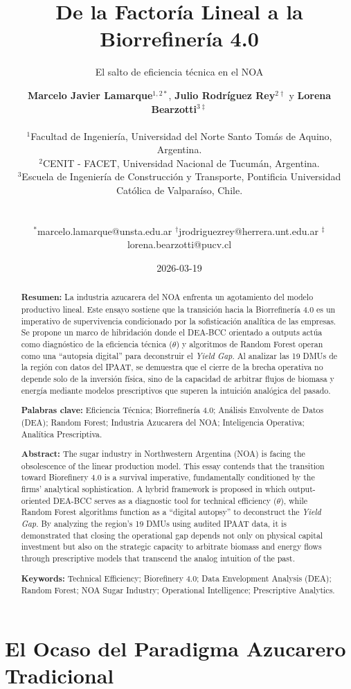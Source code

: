 \documentclass[
  spanish]{cyta}
\title{De la Factoría Lineal a la Biorrefinería 4.0}
\subtitle{El salto de eficiencia técnica en el NOA}
\author{\normalsize \textbf{Marcelo Javier Lamarque}$^{1,2*}$, \textbf{Julio Rodríguez Rey}$^{2\dagger}$ y \textbf{Lorena Bearzotti}$^{3\ddagger}$ \\[0.4cm] \parbox{\textwidth}{\centering \footnotesize $^{1}$Facultad de Ingeniería, Universidad del Norte Santo Tomás de Aquino, Argentina.\\ $^{2}$CENIT - FACET, Universidad Nacional de Tucumán, Argentina.\\ $^{3}$Escuela de Ingeniería de Construcción y Transporte, Pontificia Universidad Católica de Valparaíso, Chile.} \\[0.4cm] \parbox{\textwidth}{\centering \scriptsize $^*$marcelo.lamarque@unsta.edu.ar \quad $^\dagger$jrodriguezrey@herrera.unt.edu.ar \quad $^\ddagger$lorena.bearzotti@pucv.cl}}
\date{2026-03-19}
\begin{document}
\maketitle
\begin{abstract}
\textbf{Resumen:} La industria azucarera del NOA enfrenta un agotamiento
del modelo productivo lineal. Este ensayo sostiene que la transición
hacia la Biorrefinería 4.0 es un imperativo de supervivencia
condicionado por la sofisticación analítica de las empresas. Se propone
un marco de hibridación donde el DEA-BCC orientado a outputs actúa como
diagnóstico de la eficiencia técnica (\(\theta\)) y algoritmos de Random
Forest operan como una ``autopsia digital'' para deconstruir el
\emph{Yield Gap}. Al analizar las 19 DMUs de la región con datos del
IPAAT, se demuestra que el cierre de la brecha operativa no depende solo
de la inversión física, sino de la capacidad de arbitrar flujos de
biomasa y energía mediante modelos prescriptivos que superen la
intuición analógica del pasado.

\textbf{Palabras clave:} Eficiencia Técnica; Biorrefinería 4.0; Análisis
Envolvente de Datos (DEA); Random Forest; Industria Azucarera del NOA;
Inteligencia Operativa; Analítica Prescriptiva.

\textbf{Abstract:} The sugar industry in Northwestern Argentina (NOA) is
facing the obsolescence of the linear production model. This essay
contends that the transition toward Biorefinery 4.0 is a survival
imperative, fundamentally conditioned by the firms' analytical
sophistication. A hybrid framework is proposed in which output-oriented
DEA-BCC serves as a diagnostic tool for technical efficiency
(\(\theta\)), while Random Forest algorithms function as a ``digital
autopsy'' to deconstruct the \emph{Yield Gap}. By analyzing the region's
19 DMUs using audited IPAAT data, it is demonstrated that closing the
operational gap depends not only on physical capital investment but also
on the strategic capacity to arbitrate biomass and energy flows through
prescriptive models that transcend the analog intuition of the past.

\textbf{Keywords:} Technical Efficiency; Biorefinery 4.0; Data
Envelopment Analysis (DEA); Random Forest; NOA Sugar Industry;
Operational Intelligence; Prescriptive Analytics.
\end{abstract}


\section{El Ocaso del Paradigma Azucarero
Tradicional}\label{el-ocaso-del-paradigma-azucarero-tradicional}
\end{document}
